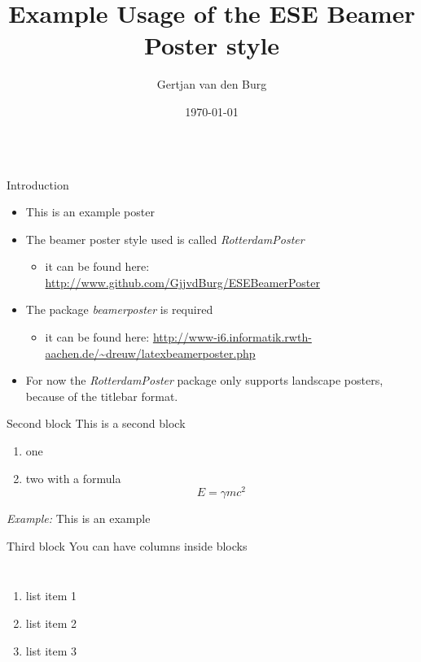 \documentclass{beamer}
\title{\Huge Example Usage of the ESE Beamer Poster style}
\author[burg@ese.eur.nl]{Gertjan van den Burg}
\institute{Econometric Institute, Erasmus University Rotterdam, The Netherlands}
\date{\today}
\begin{document}
\begin{frame}
\vspace{-1cm} %
\begin{columns}[t]
	\begin{column}{.3\paperwidth}
		\begin{block}{Introduction}
			\begin{itemize}
				\item This is an example poster
				\item The beamer poster style used is called \emph{RotterdamPoster}
				\begin{itemize}
					\item it can be found here:
					\url{http://www.github.com/GjjvdBurg/ESEBeamerPoster}
				\end{itemize}
				\item The package \emph{beamerposter} is required
				\begin{itemize}
					\item it can be found here: \url{http://www-i6.informatik.rwth-aachen.de/~dreuw/latexbeamerposter.php}
				\end{itemize}
				\item For now the \emph{RotterdamPoster} package only supports landscape posters, because of the titlebar format.
			\end{itemize}
		\end{block}
		\vfill
		\begin{block}{Second block}
			This is a second block
			\begin{enumerate}
				\item one
				\item two with a formula
					\[
						E = \gamma m c^2
					\]
			\end{enumerate}
			\emph{Example:} This is an example
		\end{block}
		\vfill
		\begin{block}{Third block}
			You can have columns inside blocks
			\begin{columns}
				\begin{enumerate}
					\item list item 1
					\item list item 2
					\item list item 3
				\end{enumerate}

\end{columns}
\end{block}
\end{column}
\end{columns}
\end{frame}
\end{document}
